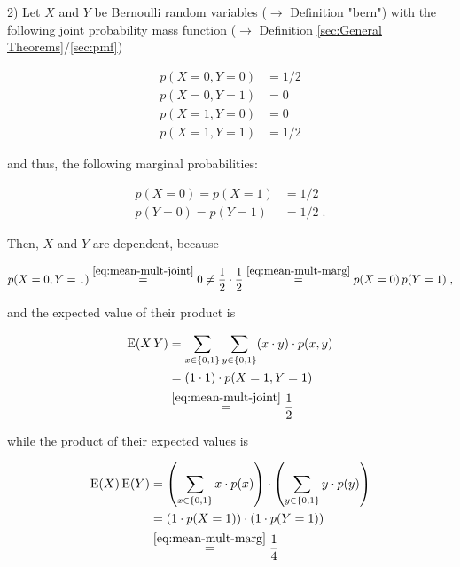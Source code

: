 \documentclass[a4paper,12pt]{book}
\begin{document}
\vspace{1em}
2) Let $X$ and $Y$ be Bernoulli random variables ($\rightarrow$ Definition "bern") with the following joint probability mass function ($\rightarrow$ Definition \ref{sec:General Theorems}/\ref{sec:pmf})

\begin{equation} \label{eq:mean-mult-joint}
\begin{split}
p(X=0, Y=0) &= 1/2 \\
p(X=0, Y=1) &= 0 \\
p(X=1, Y=0) &= 0 \\
p(X=1, Y=1) &= 1/2
\end{split}
\end{equation}

and thus, the following marginal probabilities:

\begin{equation} \label{eq:mean-mult-marg}
\begin{split}
p(X=0) = p(X=1) &= 1/2 \\
p(Y=0) = p(Y=1) &= 1/2 \; .
\end{split}
\end{equation}

Then, $X$ and $Y$ are dependent, because

\begin{equation} \label{eq:mean-mult-dep}
p(X=0, Y=1) \overset{\eqref{eq:mean-mult-joint}}{=} 0 \neq \frac{1}{2} \cdot \frac{1}{2} \overset{\eqref{eq:mean-mult-marg}}{=} p(X=0) \, p(Y=1) \; ,
\end{equation}

and the expected value of their product is

\begin{equation} \label{eq:mean-mult-mean-prod}
\begin{split}
\mathrm{E}(X\,Y) &= \sum_{x \in \left\lbrace 0,1 \right\rbrace} \sum_{y \in \left\lbrace 0,1 \right\rbrace} (x \cdot y) \cdot p(x,y) \\
&= (1 \cdot 1) \cdot p(X=1, Y=1) \\
&\overset{\eqref{eq:mean-mult-joint}}{=} \frac{1}{2}
\end{split}
\end{equation}

while the product of their expected values is

\begin{equation} \label{eq:mean-mult-prod-mean}
\begin{split}
\mathrm{E}(X) \, \mathrm{E}(Y) &= \left( \sum_{x \in \left\lbrace 0,1 \right\rbrace} x \cdot p(x) \right) \cdot \left( \sum_{y \in \left\lbrace 0,1 \right\rbrace} y \cdot p(y) \right) \\
&= \left( 1 \cdot p(X=1) \right) \cdot \left( 1 \cdot p(Y=1) \right) \\
&\overset{\eqref{eq:mean-mult-marg}}{=} \frac{1}{4}
\end{split}
\end{equation}
\end{document}
